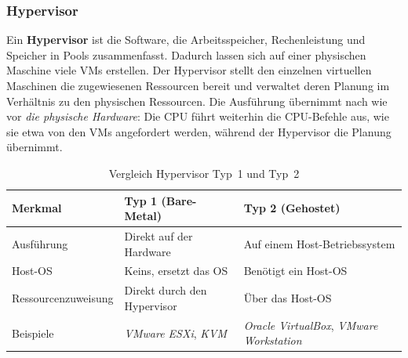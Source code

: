 \subsubsection{Hypervisor}
Ein \textbf{Hypervisor} ist die Software, die Arbeitsspeicher, Rechenleistung und
Speicher in Pools zusammenfasst. Dadurch lassen sich auf einer physischen
Maschine viele VMs erstellen. Der Hypervisor stellt den einzelnen virtuellen
Maschinen die zugewiesenen Ressourcen bereit und verwaltet deren Planung im
Verhältnis zu den physischen Ressourcen. Die Ausführung übernimmt nach wie vor
\emph{die physische Hardware}: Die CPU führt weiterhin die CPU-Befehle aus, wie sie
etwa von den VMs angefordert werden, während der Hypervisor die Planung
übernimmt.

\begin{table}[h]
    \centering
    \begin{tabular}{|l|p{5cm}|p{5cm}|}
        \hline
        \textbf{Merkmal} & \textbf{Typ 1 (Bare-Metal)} & \textbf{Typ 2 (Gehostet)} \\
        \hline
        Ausführung & Direkt auf der Hardware & Auf einem Host-Betriebssystem \\
        \hline
        Host-OS & Keins, ersetzt das OS & Benötigt ein Host-OS \\
        \hline
        Ressourcenzuweisung & Direkt durch den Hypervisor & Über das Host-OS \\
        \hline
        Beispiele & \textit{VMware ESXi}, \textit{KVM} & \textit{Oracle VirtualBox}, \textit{VMware Workstation} \\
        \hline
    \end{tabular}
    \caption{Vergleich Hypervisor Typ~1 und Typ~2}
    \label{tab:hypervisor}
\end{table}


